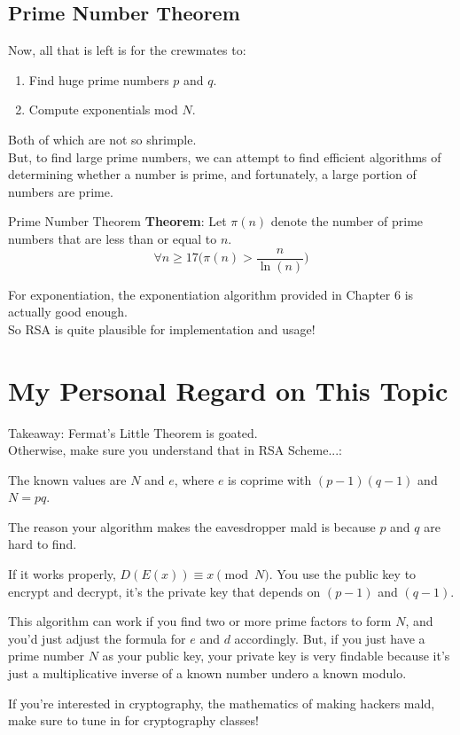 \subsection{Prime Number Theorem}
Now, all that is left is for the crewmates to:
\begin{enumerate}
    \item Find huge prime numbers $p$ and $q$.
    \item Compute exponentials mod $N$.
\end{enumerate}
Both of which are not so shrimple. \\
But, to find large prime numbers, we can attempt to find efficient algorithms of determining whether a number is prime, and fortunately, a large portion of numbers are prime. \\
\begin{ln-theorem}{Prime Number Theorem}{}
    \textbf{Theorem}: Let $\pi (n)$ denote the number of prime numbers that are less than or equal to $n$. \\
    \[\forall n \geq 17 \bigg( \pi (n) > \frac{n}{\ln(n)} \bigg)\]
\end{ln-theorem}
For exponentiation, the exponentiation algorithm provided in Chapter 6 is actually good enough. \\
So RSA is quite plausible for implementation and usage!

\section{My Personal Regard on This Topic}
Takeaway: Fermat's Little Theorem is goated. \\
Otherwise, make sure you understand that in RSA Scheme...:
\begin{bindenum}
    \item The known values are $N$ and $e$, where $e$ is coprime with $(p - 1)(q - 1)$ and $N = pq$.
    \item The reason your algorithm makes the eavesdropper mald is because $p$ and $q$ are hard to find.
    \item If it works properly, $D(E(x)) \equiv x \pmod{N}$. You use the public key to encrypt and decrypt, it's the private key that depends on $(p - 1)$ and $(q - 1)$.
    \item This algorithm can work if you find two or more prime factors to form $N$, and you'd just adjust the formula for $e$ and $d$ accordingly. But, if you just have a prime number $N$ as your public key, your private key is very findable because it's just a multiplicative inverse of a known number undero a known modulo.
\end{bindenum}
If you're interested in cryptography, the mathematics of making hackers mald, make sure to tune in for cryptography classes!
